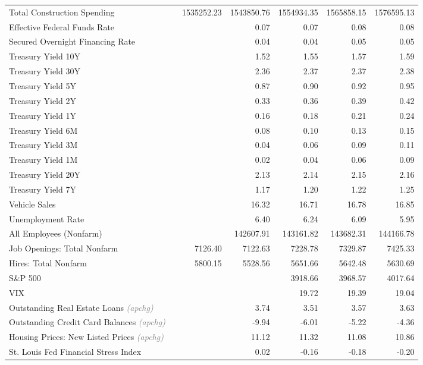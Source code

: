 \documentclass[11pt, letterpaper]{article}\usepackage[]{graphicx}\usepackage[]{color}
\begin{document}
\begin{table}[H]
\begin{tabular}{lrrrrrr}
  Total Construction Spending &  & 1535252.23 & 1543850.76 & 1554934.35 & 1565858.15 & 1576595.13 \\ 
  Effective Federal Funds Rate &  &  & 0.07 & 0.07 & 0.08 & 0.08 \\ 
  Secured Overnight Financing Rate &  &  & 0.04 & 0.04 & 0.05 & 0.05 \\ 
  Treasury Yield 10Y &  &  & 1.52 & 1.55 & 1.57 & 1.59 \\ 
  Treasury Yield 30Y &  &  & 2.36 & 2.37 & 2.37 & 2.38 \\ 
  Treasury Yield 5Y &  &  & 0.87 & 0.90 & 0.92 & 0.95 \\ 
  Treasury Yield 2Y &  &  & 0.33 & 0.36 & 0.39 & 0.42 \\ 
  Treasury Yield 1Y &  &  & 0.16 & 0.18 & 0.21 & 0.24 \\ 
  Treasury Yield 6M &  &  & 0.08 & 0.10 & 0.13 & 0.15 \\ 
  Treasury Yield 3M &  &  & 0.04 & 0.06 & 0.09 & 0.11 \\ 
  Treasury Yield 1M &  &  & 0.02 & 0.04 & 0.06 & 0.09 \\ 
  Treasury Yield 20Y &  &  & 2.13 & 2.14 & 2.15 & 2.16 \\ 
  Treasury Yield 7Y &  &  & 1.17 & 1.20 & 1.22 & 1.25 \\ 
  Vehicle Sales &  &  & 16.32 & 16.71 & 16.78 & 16.85 \\ 
  Unemployment Rate &  &  & 6.40 & 6.24 & 6.09 & 5.95 \\ 
  All Employees (Nonfarm) &  &  & 142607.91 & 143161.82 & 143682.31 & 144166.78 \\ 
  Job Openings: Total Nonfarm &  & 7126.40 & 7122.63 & 7228.78 & 7329.87 & 7425.33 \\ 
  Hires: Total Nonfarm &  & 5800.15 & 5528.56 & 5651.66 & 5642.48 & 5630.69 \\ 
  S\&P 500 &  &  &  & 3918.66 & 3968.57 & 4017.64 \\ 
  VIX &  &  &  & 19.72 & 19.39 & 19.04 \\ 
  Outstanding Real Estate Loans \textit{\footnotesize\textcolor{gray}{(apchg)}} &  &  & 3.74 & 3.51 & 3.57 & 3.63 \\ 
  Outstanding Credit Card Balances \textit{\footnotesize\textcolor{gray}{(apchg)}} &  &  & -9.94 & -6.01 & -5.22 & -4.36 \\ 
  Housing Prices: New Listed Prices \textit{\footnotesize\textcolor{gray}{(apchg)}} &  &  & 11.12 & 11.32 & 11.08 & 10.86 \\ 
  St. Louis Fed Financial Stress Index &  &  & 0.02 & -0.16 & -0.18 & -0.20 \\ 

\end{tabular}
\end{table}
\end{document}
